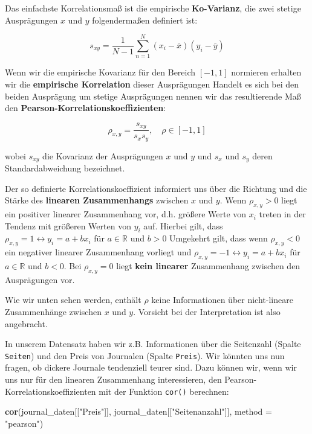 \documentclass[]{book}
\newenvironment{Shaded}{\begin{snugshade}}{\end{snugshade}}
\newcommand{\KeywordTok}[1]{\textcolor[rgb]{0.13,0.29,0.53}{\textbf{#1}}}
\newcommand{\DataTypeTok}[1]{\textcolor[rgb]{0.13,0.29,0.53}{#1}}
\newcommand{\StringTok}[1]{\textcolor[rgb]{0.31,0.60,0.02}{#1}}
\newcommand{\NormalTok}[1]{#1}
\begin{document}
Das einfachste Korrelationsmaß ist die empirische \textbf{Ko-Varianz},
die zwei stetige Ausprägungen \(x\) und \(y\) folgendermaßen definiert
ist:

\[s_{xy}=\frac{1}{N-1}\sum_{n=1}^N\left(x_i-\bar{x}\right)\left(y_i-\bar{y}\right) \]

Wenn wir die empirische Kovarianz für den Bereich \([-1, 1]\) normieren
erhalten wir die \textbf{empirische Korrelation} dieser Ausprägungen
Handelt es sich bei den beiden Ausprägung um stetige Ausprägungen nennen
wir das resultierende Maß den
\textbf{Pearson-Korrelationskoeffizienten}:

\[\rho_{x,y}=\frac{s_{xy}}{s_xs_y}, \quad \rho\in[-1,1]\]

wobei \(s_{xy}\) die Kovarianz der Ausprägungen \(x\) und \(y\) und
\(s_x\) und \(s_y\) deren Standardabweichung bezeichnet.

Der so definierte Korrelationskoeffizient informiert uns über die
Richtung und die Stärke des \textbf{linearen Zusammenhangs} zwischen
\(x\) und \(y\). Wenn \(\rho_{x,y}>0\) liegt ein positiver linearer
Zusammenhang vor, d.h. größere Werte von \(x_i\) treten in der Tendenz
mit größeren Werten von \(y_i\) auf. Hierbei gilt, dass
\(\rho_{x,y}=1 \leftrightarrow y_i = a + b x_i\) für \(a\in \mathbb{R}\)
und \(b>0\) Umgekehrt gilt, dass wenn \(\rho_{x,y}<0\) ein negativer
linearer Zusammenhang vorliegt und
\(\rho_{x,y}=-1 \leftrightarrow y_i = a + b x_i\) für
\(a\in \mathbb{R}\) und \(b<0\). Bei \(\rho_{x,y}=0\) liegt \textbf{kein
linearer} Zusammenhang zwischen den Ausprägungen vor.

Wie wir unten sehen werden, enthält \(\rho\) keine Informationen über
nicht-lineare Zusammenhänge zwischen \(x\) und \(y\). Vorsicht bei der
Interpretation ist also angebracht.

In unserem Datensatz haben wir z.B. Informationen über die Seitenzahl
(Spalte \texttt{Seiten}) und den Preis von Journalen (Spalte
\texttt{Preis}). Wir könnten uns nun fragen, ob dickere Journale
tendenziell teurer sind. Dazu können wir, wenn wir uns nur für den
linearen Zusammenhang interessieren, den
Pearson-Korrelationskoeffizienten mit der Funktion \texttt{cor()}
berechnen:

\begin{Shaded}
\begin{Highlighting}[]
\KeywordTok{cor}\NormalTok{(journal_daten[[}\StringTok{"Preis"}\NormalTok{]], journal_daten[[}\StringTok{"Seitenanzahl"}\NormalTok{]], }
    \DataTypeTok{method =} \StringTok{"pearson"}\NormalTok{)}
\end{Highlighting}
\end{Shaded}
\end{document}
